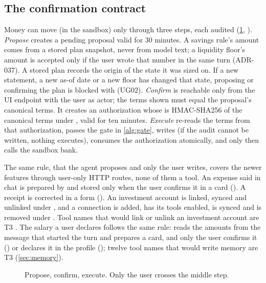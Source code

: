\subsection{The confirmation contract}\label{sec:confirmation}

Money can move (in the sandbox) only through three steps, each audited (\cref{fig:confirmation},
). \emph{Propose} creates a pending proposal valid for 30 minutes. A savings
rule's amount comes from a stored plan snapshot, never from model text; a liquidity floor's amount is accepted only if
the user wrote that number in the same turn (ADR-037). A stored plan records the origin of the state it was sized
on. If a new statement, a new as-of date or a new floor has changed that state, proposing or confirming the plan is
blocked with  (UG02). \emph{Confirm} is reachable only from the UI endpoint
 with the user as actor; the terms shown must equal the proposal's
canonical terms. It creates an authorization whose  is HMAC-SHA256 of the canonical terms under
, valid for ten minutes. \emph{Execute} re-reads the terms from that authorization, passes the
gate in \cref{alg:gate}, writes  (if the audit cannot be written, nothing executes), consumes
the authorization atomically, and only then calls the sandbox bank.

The same rule, that the agent proposes and only the user writes, covers the newer features through user-only HTTP
routes, none of them a tool. An expense said in chat is prepared by  and stored only when the
user confirms it in a card (). A receipt is corrected in a form
(). An investment account is linked, synced and unlinked under ,
and a connection is added, has its tools enabled, is synced and is removed under . Tool names
that would link or unlink an investment account are T3 . The salary a user declares follows the
same rule:  reads the amounts from the message that started the turn and prepares a card,
and only the user confirms it () or declares it in the profile
(); twelve tool names that would write memory are T3 
(\cref{sec:memory}).

\begin{figure}[htbp]
  \centering
  
  \caption{Propose, confirm, execute. Only the user crosses the middle step.}\label{fig:confirmation}
\end{figure}


